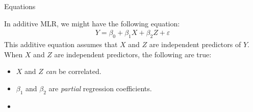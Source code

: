 \documentclass{beamer}\usepackage[]{graphicx}\usepackage[]{color}
\begin{document}
\begin{frame}{Equations}

  In additive MLR, we might have the following equation:
  \begin{align*}
    Y = \beta_0 + \beta_1X + \beta_2Z + \varepsilon
  \end{align*}
  This additive equation assumes that $X$ and $Z$ are independent
  predictors of $Y$.\\
  \va
  When $X$ and $Z$ are independent predictors, the following are true:
  \vb
  \begin{itemize}
  \item $X$ and $Z$ \emph{can} be correlated.
    \vb
  \item $\beta_1$ and $\beta_2$ are \emph{partial} regression
    coefficients.
    \vb
  \item {}
  \end{itemize}

\end{frame}

\watermarkoff %
\end{document}
